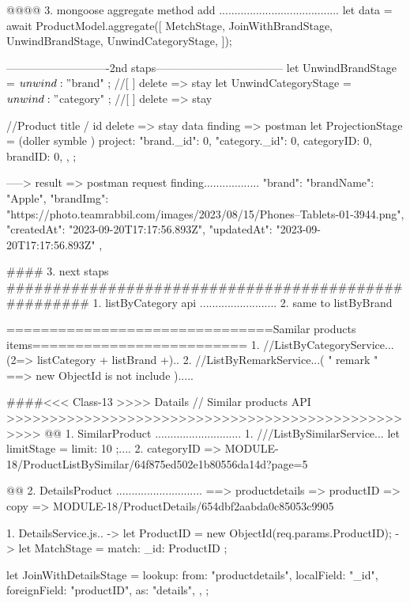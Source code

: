 @@@@ 3. mongoose aggregate method add .......................................
        let data = await ProductModel.aggregate([
          MetchStage,
          JoinWithBrandStage,
           UnwindBrandStage,
          UnwindCategoryStage,
        ]);


----------------------------2nd staps-----------------------------------
let UnwindBrandStage = { $unwind: "$brand" }; //[ ] delete => stay {}
let UnwindCategoryStage = { $unwind: "$category" }; //[ ] delete => stay {}

//Product title / id delete => stay data finding => postman
let ProjectionStage = {
  (doller symble ) project: {
    "brand._id": 0,
    "category._id": 0,
    categoryID: 0,
    brandID: 0,
  },
};

-----> result => postman request finding..................
"brand": {
  "brandName": "Apple",
  "brandImg": "https://photo.teamrabbil.com/images/2023/08/15/Phones--Tablets-01-3944.png",
  "createdAt": "2023-09-20T17:17:56.893Z",
  "updatedAt": "2023-09-20T17:17:56.893Z"
},

#### 3. next staps ####################################################
   1. listByCategory api .........................
   2. same to listByBrand


===============================Samilar products items=========================
1. //ListByCategoryService...(2=> listCategory + listBrand +)..
2. //ListByRemarkService...( " remark " ==> new ObjectId is not include ).....



####<<< Class-13 >>>> Datails // Similar products API >>>>>>>>>>>>>>>>>>>>>>>>>>>>>>>>>>>>>>>>>>>>>>>>>>
@@ 1. SimilarProduct ............................
      1. ///ListBySimilarService... let limitStage = { limit: 10 };....
      2. categoryID =>  {{MODULE-18}}/ProductListBySimilar/64f875ed502e1b80556da14d?page=5

@@ 2. DetailsProduct ............................
    ==> productdetails => productID => copy => {{MODULE-18}}/ProductDetails/654dbf2aabda0c85053c9905

       1. DetailsService.js..
          -> let ProductID = new ObjectId(req.params.ProductID);
          -> let MatchStage = { match: { _id: ProductID } };

          let JoinWithDetailsStage = {
            lookup: {
              from: "productdetails",
              localField: "_id",
              foreignField: "productID",
              as: "details",
            },
          };

